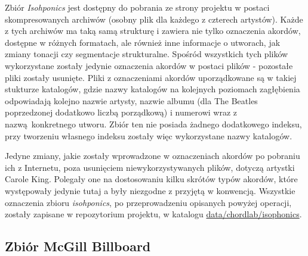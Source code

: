 Zbiór \emph{Isohponics} jest dostępny do pobrania ze strony projektu w postaci skompresowanych
archiwów  (osobny plik dla każdego z czterech artystów). Każde z tych archiwów ma taką
samą strukturę i zawiera nie tylko oznaczenia akordów, dostępne w różnych formatach, ale również
inne informacje o utworach, jak zmiany tonacji czy segmentacje strukturalne. Spośród wszystkich tych
plików wykorzystane zostały jedynie oznaczenia akordów w postaci plików  - pozostałe pliki
zostały usunięte. Pliki z oznaczeniami akordów uporządkowane są w takiej stukturze katalogów, gdzie
nazwy katalogów na kolejnych poziomach zagłębienia odpowiadają kolejno nazwie artysty, nazwie albumu
(dla The Beatles poprzedzonej dodatkowo liczbą porządkową) i numerowi wraz z nazwą konkretnego
utworu. Zbiór ten nie posiada żadnego dodatkowego indeksu, przy tworzeniu własnego indeksu zostały
więc wykorzystane nazwy katalogów.

Jedyne zmiany, jakie zostały wprowadzone w oznaczeniach akordów po pobraniu ich z Internetu, poza
usunięciem niewykorzystywanych plików, dotyczą artystki Carole King. Polegały one na dostosowaniu
kilku skrótów typów akordów, które występowały jedynie tutaj a były niezgodne z przyjętą w
\cite{harte_towards_nodate} konwencją. Wszystkie oznaczenia zbioru \emph{isohponics}, po
przeprowadzeniu opisanych powyżej operacji, zostały zapisane w repozytorium projektu, w katalogu
\url{data/chordlab/isophonics}.


\subsection{Zbiór McGill Billboard}


